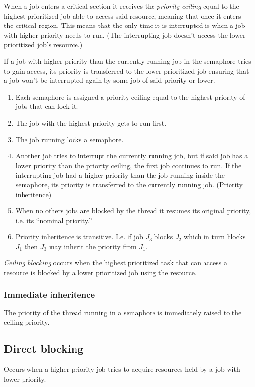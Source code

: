 \documentclass[a4paper]{article}
\begin{document}
When a job enters a critical section it receives the \emph{priority ceiling} 
equal to the highest prioritized job able to access said resource, meaning that
once it enters the critical region. This means that the only time it is
interrupted is when a job with higher priority needs to run. (The interrupting
job doesn't access the lower prioritized job's resource.)

If a job with higher priority than the currently running job in the semaphore
tries to gain access, its priority is transferred to the lower prioritized job
ensuring that a job won't be interrupted again by some job of said priority or
lower.

\begin{enumerate}
  \item Each semaphore is assigned a priority ceiling equal to the highest
        priority of jobs that can lock it.
  \item The job with the highest priority gets to run first.
  \item The job running locks a semaphore.
  \item Another job tries to interrupt the currently running job, but if said
        job has a lower priority than the priority ceiling, the first job
        continues to run. If the interrupting job had a higher priority than
        the job running inside the semaphore, its priority is transferred to the
        currently running job. (Priority inheritence)
  \item When no others jobs are blocked by the thread it resumes its original
        priority, i.e. its ``nominal priority.''
  \item Priority inheritence is transitive. I.e. if job $J_3$ blocks $J_2$ which
        in turn blocks $J_1$ then $J_3$ may inherit the priority from $J_1$.
\end{enumerate}

\emph{Ceiling blocking} occurs when the highest prioritized task that can access
a resource is blocked by a lower prioritized job using the resource.

\subsubsection{Immediate inheritence}
The priority of the thread running in a semaphore is immediately raised to the
ceiling priority.

\subsection{Direct blocking}
Occurs when a higher-priority job tries to acquire resources held by a job
with lower priority.
\end{document}
